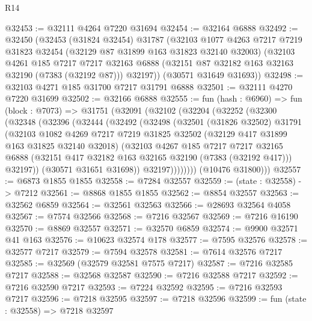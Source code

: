 \begin{lexlean}{R14}
\begin{coremodule}
@32453 := @32111 @4264 @7220 @31694
@32454 := @32164 @6888
@32492 := @32450
    (@32453
      (@31824 @32454)
      @31787
      (@32103
        @1077
        @4263
        @7217
        @7219
        @31823
        @32454
        (@32129 @87 @31899 @163 @31823 @32140 @32003)
        (@32103
          @4261
          @185
          @7217
          @7217
          @32163
          @6888
          (@32151 @87 @32182 @163 @32163 @32190 (@7383 (@32192 @87)))
          @32197))
      (@30571 @31649 @31693))
@32498 := @32103 @4271 @185 @31700 @7217 @31791 @6888
@32501 := @32111 @4270 @7220 @31699
@32502 := @32166 @6888
@32555 := fun (hash : @6960) =>
  fun (block : @7073) =>
  @31751
    (@32091
      (@32102
        (@32204
          (@32252
            (@32300
              (@32348
                (@32396
                  (@32444
                    (@32492
                      (@32498
                        (@32501
                          (@31826 @32502)
                          @31791
                          (@32103
                            @1082
                            @4269
                            @7217
                            @7219
                            @31825
                            @32502
                            (@32129 @417 @31899 @163 @31825 @32140 @32018)
                            (@32103
                              @4267
                              @185
                              @7217
                              @7217
                              @32165
                              @6888
                              (@32151 @417 @32182 @163 @32165 @32190 (@7383 (@32192 @417)))
                              @32197))
                          (@30571 @31651 @31698))
                        @32197))))))))
        (@10476 @31800)))
@32557 := @6873 @1855 @1855
@32558 := @7284 @32557
@32559 := (state : @32558) -> @7212
@32561 := @8868 @1855 @1855
@32562 := @8854 @32557
@32563 := @32562 @6859
@32564 := @32561 @32563
@32566 := @28693 @32564 @4058
@32567 := @7574 @32566
@32568 := @7216 @32567
@32569 := @7216 @16190
@32570 := @8869 @32557
@32571 := @32570 @6859
@32574 := @9900 @32571 @41 @163
@32576 := @10623 @32574 @178
@32577 := @7595 @32576
@32578 := @32577 @7217
@32579 := @7594 @32578
@32581 := @7614 @32576 @7217
@32585 := @32569 (@32579 @32581 @7575 @7217)
@32587 := @7216 @32585 @7217
@32588 := @32568 @32587
@32590 := @7216 @32588 @7217
@32592 := @7216 @32590 @7217
@32593 := @7224 @32592
@32595 := @7216 @32593 @7217
@32596 := @7218 @32595
@32597 := @7218 @32596
@32599 := fun (state : @32558) => @7218 @32597

\end{coremodule}
\end{lexlean}
